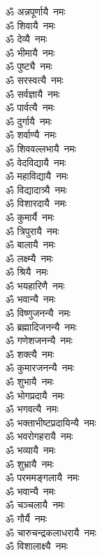 \begin{multicols}{2}
\begin{flushleft}
ॐ अन्नपूर्णायै~नमः\\
ॐ शिवायै~नमः\\
ॐ देव्यै~नमः\\
ॐ भीमायै~नमः\\
ॐ पुष्ट्यै~नमः\\
ॐ सरस्वत्यै~नमः\\
ॐ सर्वज्ञायै~नमः\\
ॐ पार्वत्यै~नमः\\
ॐ दुर्गायै~नमः\\
ॐ शर्वाण्यै~नमः\hfill{}\\
ॐ शिववल्लभायै~नमः\\
ॐ वेदविद्यायै~नमः\\
ॐ महाविद्यायै~नमः\\
ॐ विद्यादात्र्यै~नमः\\
ॐ विशारदायै~नमः\\
ॐ कुमार्यै~नमः\\
ॐ त्रिपुरायै~नमः\\
ॐ बालायै~नमः\\
ॐ लक्ष्म्यै~नमः\\
ॐ श्रियै~नमः\hfill{}\\
ॐ भयहारिणै~नमः\\
ॐ भवान्यै~नमः\\
ॐ विष्णुजनन्यै~नमः\\
ॐ ब्रह्मादिजनन्यै~नमः\\
ॐ गणेशजनन्यै~नमः\\
ॐ शक्त्यै~नमः\\
ॐ कुमारजनन्यै~नमः\\
ॐ शुभायै~नमः\\
ॐ भोगप्रदायै~नमः\\
ॐ भगवत्यै~नमः\hfill{}\\
ॐ भक्ताभीष्टप्रदायिन्यै~नमः\\
ॐ भवरोगहरायै~नमः\\
ॐ भव्यायै~नमः\\
ॐ शुभ्रायै~नमः\\
ॐ परममङ्गलायै~नमः\\
ॐ भवान्यै~नमः\\
ॐ चञ्चलायै~नमः\\
ॐ गौर्यै~नमः\\
ॐ चारुचन्द्रकलाधरायै~नमः\\
ॐ विशालाक्ष्यै~नमः\hfill{}\\

\end{flushleft}
\end{multicols}
